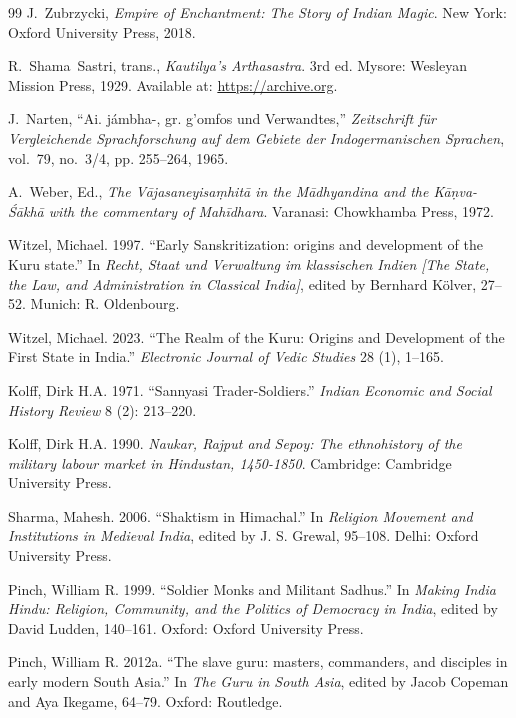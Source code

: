 \documentclass[11pt,twoside,letterpaper]{article}
\begin{document}
\begin{thebibliography}{99}
J.~Zubrzycki, \textit{Empire of Enchantment: The Story of Indian Magic}. New York: Oxford University Press, 2018.

R.~Shama~Sastri, trans., \textit{Kautilya's Arthasastra}. 3rd ed. Mysore: Wesleyan Mission Press, 1929. Available at: \url{https://archive.org}.

J.~Narten, ``Ai. jámbha-, gr. \textgreek{g'omfos} und Verwandtes,'' \textit{Zeitschrift für Vergleichende Sprachforschung auf dem Gebiete der Indogermanischen Sprachen}, vol.~79, no.~3/4, pp. 255--264, 1965. 

A.~Weber, Ed., \textit{The Vājasaneyisaṃhitā in the Mādhyandina and the Kāṇva-Śākhā with the commentary of Mahīdhara}. Varanasi: Chowkhamba Press, 1972.

Witzel, Michael. 1997. ``Early Sanskritization: origins and development of the Kuru state.'' In \textit{Recht, Staat und Verwaltung im klassischen Indien [The State, the Law, and Administration in Classical India]}, edited by Bernhard Kölver, 27–52. Munich: R. Oldenbourg.

Witzel, Michael. 2023. ``The Realm of the Kuru: Origins and Development of the First State in India.'' \textit{Electronic Journal of Vedic Studies} 28 (1), 1–165.

Kolff, Dirk H.A. 1971. ``Sannyasi Trader-Soldiers.'' \textit{Indian Economic and Social History Review} 8 (2): 213–220.

Kolff, Dirk H.A. 1990. \textit{Naukar, Rajput and Sepoy: The ethnohistory of the military labour market in Hindustan, 1450-1850}. Cambridge: Cambridge University Press.

Sharma, Mahesh. 2006. ``Shaktism in Himachal.'' In \textit{Religion Movement and Institutions in Medieval India}, edited by J. S. Grewal, 95–108. Delhi: Oxford University Press.

Pinch, William R. 1999. ``Soldier Monks and Militant Sadhus.'' In \textit{Making India Hindu: Religion, Community, and the Politics of Democracy in India}, edited by David Ludden, 140–161. Oxford: Oxford University Press.

Pinch, William R. 2012a. ``The slave guru: masters, commanders, and disciples in early modern South Asia.'' In \textit{The Guru in South Asia}, edited by Jacob Copeman and Aya Ikegame, 64–79. Oxford: Routledge.


\end{thebibliography}
\end{document}
